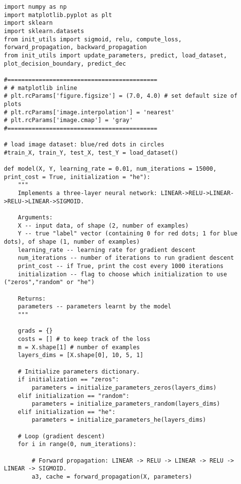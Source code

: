 \clearpage
{}
\begin{verbatim}
import numpy as np
import matplotlib.pyplot as plt
import sklearn
import sklearn.datasets
from init_utils import sigmoid, relu, compute_loss, forward_propagation, backward_propagation
from init_utils import update_parameters, predict, load_dataset, plot_decision_boundary, predict_dec

#===========================================
# # matplotlib inline
# plt.rcParams['figure.figsize'] = (7.0, 4.0) # set default size of plots
# plt.rcParams['image.interpolation'] = 'nearest'
# plt.rcParams['image.cmap'] = 'gray'
#===========================================

# load image dataset: blue/red dots in circles
#train_X, train_Y, test_X, test_Y = load_dataset()

def model(X, Y, learning_rate = 0.01, num_iterations = 15000, print_cost = True, initialization = "he"):
    """
    Implements a three-layer neural network: LINEAR->RELU->LINEAR->RELU->LINEAR->SIGMOID.
    
    Arguments:
    X -- input data, of shape (2, number of examples)
    Y -- true "label" vector (containing 0 for red dots; 1 for blue dots), of shape (1, number of examples)
    learning_rate -- learning rate for gradient descent 
    num_iterations -- number of iterations to run gradient descent
    print_cost -- if True, print the cost every 1000 iterations
    initialization -- flag to choose which initialization to use ("zeros","random" or "he")
    
    Returns:
    parameters -- parameters learnt by the model
    """
        
    grads = {}
    costs = [] # to keep track of the loss
    m = X.shape[1] # number of examples
    layers_dims = [X.shape[0], 10, 5, 1]
    
    # Initialize parameters dictionary.
    if initialization == "zeros":
        parameters = initialize_parameters_zeros(layers_dims)
    elif initialization == "random":
        parameters = initialize_parameters_random(layers_dims)
    elif initialization == "he":
        parameters = initialize_parameters_he(layers_dims)

    # Loop (gradient descent)
    for i in range(0, num_iterations):

        # Forward propagation: LINEAR -> RELU -> LINEAR -> RELU -> LINEAR -> SIGMOID.
        a3, cache = forward_propagation(X, parameters)
        

\end{verbatim}
